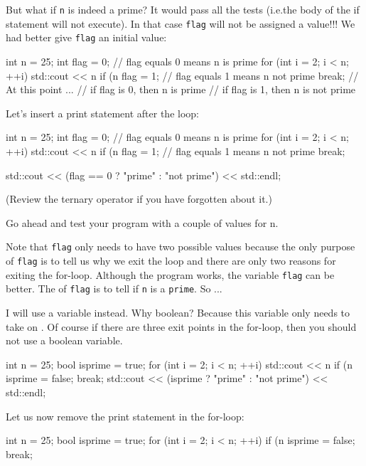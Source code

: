 \begin{console}
But what if \texttt{n} is indeed a prime? It would pass all the tests
(i.e.the body of the if statement will not execute). In that case
\texttt{flag} will not be assigned a value!!! We had better give
\texttt{flag} an initial value:
\begin{console}
int n = 25;
int flag = 0; // flag equals 0 means n is prime
for (int i = 2; i < n; ++i)
{   
    std::cout << n %
    if (n %
    {
        flag = 1; // flag equals 1 means n not prime
        break;
    }
}
// At this point ...
// if flag is 0, then n is prime
// if flag is 1, then n is not prime \\
\end{console}
Let's insert a print statement after the loop:
\begin{console}
int n = 25;
int flag = 0; // flag equals 0 means n is prime
for (int i = 2; i < n; ++i)
{   
    std::cout << n %
    if (n %
    {
        flag = 1; // flag equals 1 means n not prime
        break;
    }
}

std::cout << (flag == 0 ? "prime" : "not prime")
          << std::endl;
\end{console}
(Review the ternary operator if you have forgotten about it.)

Go ahead and test your program with a couple of values for n.

Note that \texttt{flag} only needs to have two possible values because the
only purpose of \texttt{flag} is to tell us why we exit the loop and there
are only two reasons for exiting the for-loop. Although the program
works, the variable  \texttt{flag} can be better. The
 of \texttt{flag} is to tell if \texttt{n} is a
\texttt{prime}. So ...

I will use a \texttt{} variable \texttt{}
instead. Why boolean? Because this variable only needs to take on
. Of course if there are three exit points
in the for-loop, then you should not use a boolean variable.
\begin{console}
int n = 25;
bool isprime = true;
for (int i = 2; i < n; ++i)
{   
    std::cout << n %
    if (n %
    {  
        isprime = false;
        break;
    }
}
std::cout << (isprime ? "prime" : "not prime") << std::endl;
\end{console}
Let us now remove the print statement in the for-loop:
\begin{console}
int n = 25;
bool isprime = true;
for (int i = 2; i < n; ++i)
{   
    if (n %
    {
        isprime = false;
        break;
    }
}


\end{console}
\end{console}
